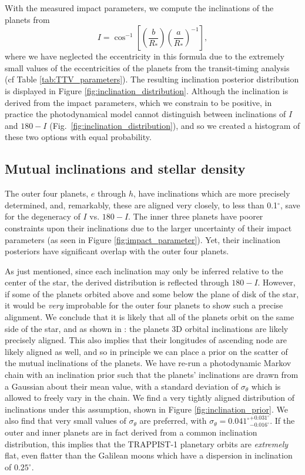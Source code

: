\documentclass[fleqn,usenatbib]{mnras} %
\begin{document}
With the measured impact parameters, we compute the inclinations of the planets
from
\begin{equation}
    I = \cos^{-1}\left[ \left(\frac{b}{R_*}\right)
    \left(\frac{a}{R_*}\right)^{-1}\right],
\end{equation}
where we have neglected the eccentricity in this formula due to the extremely
small values of the eccentricities of the planets from the transit-timing
analysis (cf Table \ref{tab:TTV_parameters}).  The resulting inclination
posterior distribution is displayed in Figure \ref{fig:inclination_distribution}.  
Although the inclination is derived from the impact parameters, which we constrain 
to be positive, in practice the photodynamical model cannot distinguish between 
inclinations of $I$ and $180-I$ (Fig.\ \ref{fig:inclination_distribution}), and so we created a histogram of these two options 
with equal probability.

\subsection{Mutual inclinations and stellar density}

The outer four planets, $e$ through $h$, have inclinations which are more
precisely determined, and, remarkably, these are aligned
very closely, to less than 0.1$^\circ$, save for the degeneracy of $I$ vs.
$180-I$.  The inner three planets have poorer
constraints upon their inclinations due to the larger uncertainty of their
impact parameters (as seen in Figure \ref{fig:impact_parameter}).  Yet, their inclination posteriors have significant overlap
with the outer four planets.

As just mentioned, since each inclination may only be inferred relative to the center of
the star, the derived distribution is reflected through $180-I$.
However, if some of the planets orbited above and some below the plane of disk
of the star, it would be {\it very} improbable for the outer four planets to show
such a precise alignment.  We conclude that it is likely that all of the planets orbit on
the same side of the star, and as shown in \citet{Luger2017b}: the planets
3D orbital inclinations are likely precisely aligned.   This also implies
that their longitudes of ascending node are likely aligned as well, and
so in principle we can place a prior on the scatter of the mutual inclinations 
of the planets.  We have re-run a photodynamic Markov chain with an inclination prior such
that the planets' inclinations are drawn from a Gaussian about their mean value, 
with a standard deviation of $\sigma_\theta$ which is allowed to freely vary in 
the chain.  We find a very tightly aligned distribution of inclinations under 
this assumption, shown in Figure \ref{fig:inclination_prior}.  We also find that 
very small values of $\sigma_\theta$ are preferred, with $ \sigma_\theta = {0.041^\circ}_{-0.016^\circ}^{+0.031^\circ} $.
If the outer and inner planets are in fact derived from a common inclination 
distribution, this implies that the TRAPPIST-1 planetary orbits are {\it extremely} 
flat, even flatter than the Galilean moons which have a dispersion in inclination of 
$0.25^\circ$.  
\end{document}
